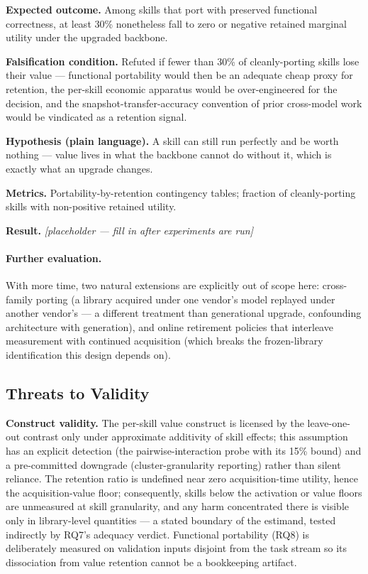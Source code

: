 \documentclass[11pt]{article}
\newcommand{\resultplaceholder}{\textit{[placeholder --- fill in after experiments are run]}}
\begin{document}
\textbf{Expected outcome.} Among skills that port with preserved functional correctness, at least 30\% nonetheless fall to zero or negative retained marginal utility under the upgraded backbone.

\textbf{Falsification condition.} Refuted if fewer than 30\% of cleanly-porting skills lose their value --- functional portability would then be an adequate cheap proxy for retention, the per-skill economic apparatus would be over-engineered for the decision, and the snapshot-transfer-accuracy convention of prior cross-model work \citep{AFTER2026} would be vindicated as a retention signal.

\textbf{Hypothesis (plain language).} A skill can still run perfectly and be worth nothing --- value lives in what the backbone cannot do without it, which is exactly what an upgrade changes.

\textbf{Metrics.} Portability-by-retention contingency tables; fraction of cleanly-porting skills with non-positive retained utility.

\textbf{Result.} \resultplaceholder

\paragraph{Further evaluation.}
With more time, two natural extensions are explicitly out of scope here: cross-family porting (a library acquired under one vendor's model replayed under another vendor's --- a different treatment than generational upgrade, confounding architecture with generation), and online retirement policies that interleave measurement with continued acquisition (which breaks the frozen-library identification this design depends on).

\subsection{Threats to Validity}

\textbf{Construct validity.} The per-skill value construct is licensed by the leave-one-out contrast only under approximate additivity of skill effects; this assumption has an explicit detection (the pairwise-interaction probe with its 15\% bound) and a pre-committed downgrade (cluster-granularity reporting) rather than silent reliance. The retention ratio is undefined near zero acquisition-time utility, hence the acquisition-value floor; consequently, skills below the activation or value floors are unmeasured at skill granularity, and any harm concentrated there is visible only in library-level quantities --- a stated boundary of the estimand, tested indirectly by RQ7's adequacy verdict. Functional portability (RQ8) is deliberately measured on validation inputs disjoint from the task stream so its dissociation from value retention cannot be a bookkeeping artifact.
\end{document}
